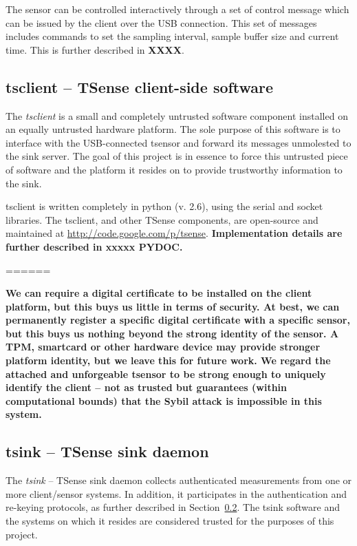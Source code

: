 The sensor can be controlled interactively through a set of control message which can be issued by the client over the USB connection. This set of messages includes commands to set the sampling interval, sample buffer size and current time. This is further described in \textbf{XXXX}.

\subsection{tsclient -- TSense client-side software}

The \textit{tsclient} is a small and completely untrusted software component installed on an equally untrusted hardware platform. The sole purpose of this software is to interface with the USB-connected tsensor and forward its messages unmolested to the sink server. The goal of this project is in essence to force this untrusted piece of software and the platform it resides on to provide trustworthy information to the sink.

tsclient is written completely in python (v. 2.6), using the serial and socket libraries. The tsclient, and other TSense components, are open-source and maintained at \url{http://code.google.com/p/tsense}. \textbf{Implementation details are further described in xxxxx PYDOC.}

======

\textbf{We can require a digital certificate to be installed on the client platform, but this buys us little in terms of security. At best, we can permanently register a specific digital certificate with a specific sensor, but this buys us nothing beyond the strong identity of the sensor. A TPM, smartcard or other hardware device may provide stronger platform identity, but we leave this for future work. 
%
We regard the attached and unforgeable tsensor to be strong enough to uniquely identify the client -- not as trusted but guarantees (within computational bounds) that the Sybil attack \cite{} is impossible in this system.}


\subsection{tsink -- TSense sink daemon}

The \textit{tsink} -- TSense sink daemon collects authenticated measurements from one or more client/sensor systems. In addition, it participates in the authentication and re-keying protocols, as further described in Section~\ref{}. The tsink software and the systems on which it resides are considered trusted for the purposes of this project.

